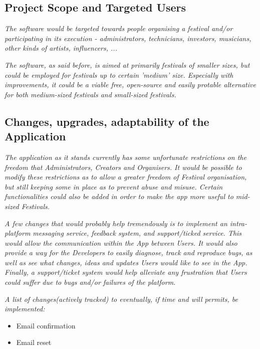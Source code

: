 	\subsection{Project Scope and Targeted Users}
	\textit{The software would be targeted towards people organising a festival and/or participating in its execution - administrators, technicians, investors, musicians, other kinds of artists, influencers, ...}
	
	\textit{The software, as said before, is aimed at primarily festivals of smaller sizes, but could be employed for festivals up to certain 'medium' size. Especially with improvements, it could be a viable free, open-source and easily protable alternative for both medium-sized festivals and small-sized festivals.}
	
	\subsection{Changes, upgrades, adaptability of the Application}
	\textit{The application as it stands currently has some unfortunate restrictions on the freedom that Administrators, Creators and Organisers. It would be possible to modify these restrictions as to allow a greater freedom of Festival organisation, but still keeping some in place as to prevent abuse and misuse. Certain functionalities could also be added in order to make the app more useful to mid-sized Festivals.}
	
	\textit{A few changes that would probably help tremendously is to implement an intra-platform messaging service, feedback system, and support/ticked service. This would allow the communication within the App between Users. It would also provide a way for the Developers to easily diagnose, track and reproduce bugs, as well as see what changes, ideas and updates Users would like to see in the App. Finally, a support/ticket system would help alleviate any frustration that Users could suffer due to bugs and/or failures of the platform.}
	
	\textit{A list of changes(actively tracked) to eventually, if time and will permits, be implemented:}
	\begin{itemize}
		\item Email confirmation
		\item Email reset
	\end{itemize}











\eject

